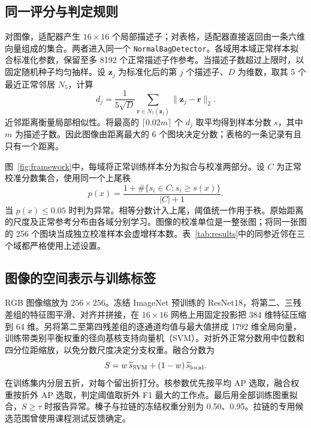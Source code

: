 \documentclass[sigconf,nonacm,screen]{acmart}
\begin{document}
\subsection{同一评分与判定规则}
对图像，适配器产生 $16\times16$ 个局部描述子；对表格，适配器直接返回由一条六维向量组成的集合。两者进入同一个 \texttt{NormalBagDetector}。各域用本域正常样本拟合标准化参数，保留至多 8192 个正常描述子作参考。当描述子数超过上限时，以固定随机种子均匀抽样。设 $\mathbf z_j$ 为标准化后的第 $j$ 个描述子、$D$ 为维数，取其 5 个最近正常邻居 $N_5$，计算
\begin{equation}
d_j=\frac{1}{5\sqrt D}\sum_{\mathbf r\in N_5(\mathbf z_j)}\lVert\mathbf z_j-\mathbf r\rVert_2 .
\end{equation}
近邻距离衡量局部相似性\cite{cover1967}。将最高的 $\lceil0.02m\rceil$ 个 $d_j$ 取平均得到样本分数 $s$，其中 $m$ 为描述子数。因此图像由距离最大的 6 个图块决定分数；表格的一条记录有且只有一个距离。

图~\ref{fig:framework}中，每域将正常训练样本分为拟合与校准两部分。设 $C$ 为正常校准分数集合，使用同一个上尾秩
\begin{equation}
p(x)=\frac{1+\#\{s_i\in C:s_i\ge s(x)\}}{|C|+1}.
\end{equation}
当 $p(x)\le 0.05$ 时判为异常。相等分数计入上尾，阈值统一作用于秩。原始距离的尺度及正常参考分布由各域分别学习。图像的校准单位是一整张图；将同一张图的 256 个图块当成独立校准样本会虚增样本数。表~\ref{tab:results}中的同参近邻在三个域都严格使用上述设置。

\subsection{图像的空间表示与训练标签}
RGB 图像缩放为 $256\times256$。冻结 ImageNet 预训练的 ResNet18\cite{he2016}，将第二、三残差组的特征图平滑、对齐并拼接，在 $16\times16$ 网格上用固定投影把 384 维特征压缩到 64 维。另将第二至第四残差组的逐通道均值与最大值拼成 1792 维全局向量，训练带类别平衡权重的径向基核支持向量机（SVM）。对折外正常分数用中位数和四分位距缩放，以免分数尺度决定分支权重。融合分数为
\begin{equation}
S=w\,\widetilde s_{\rm SVM}+(1-w)\,\widetilde s_{\rm local}.
\end{equation}
在训练集内分层五折，对每个留出折打分。核参数优先按平均 AP 选取，融合权重按折外 AP 选取，判定阈值取折外 F1 最大的工作点。最后用全部训练图重拟合，$S\ge\tau$ 时报告异常。榛子与拉链的冻结权重分别为 0.50、0.95。拉链的专用候选范围曾使用课程测试反馈确定。
\end{document}
